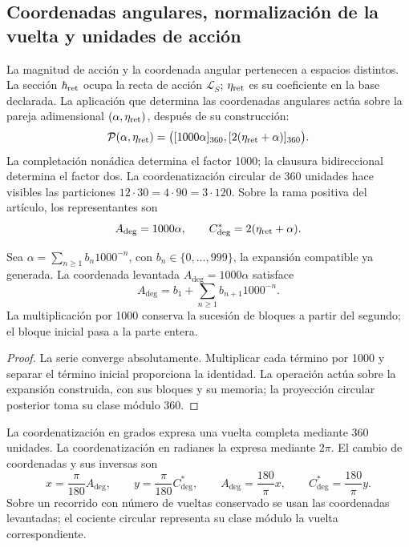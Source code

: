 \subsection{Coordenadas angulares, normalización de la vuelta y unidades de acción}
\label{sec:ii-angulos}

La magnitud de acción y la coordenada angular pertenecen a espacios
distintos. La sección \(\hbar_{\rm ret}\) ocupa la recta de acción
\(\mathcal L_S\); \(\eta_{\rm ret}\) es su coeficiente en la base
declarada. La aplicación que determina las coordenadas angulares actúa sobre la pareja adimensional
\((\alpha,\eta_{\rm ret})\), después de su construcción:
\begin{equation}
 \mathcal P(\alpha,\eta_{\rm ret})
 =\bigl([1000\alpha]_{360},[2(\eta_{\rm ret}+\alpha)]_{360}\bigr).
 \label{eq:ii-par-angular}
\end{equation}
La completación nonádica determina el factor 1000; la clausura
bidireccional determina el factor dos. La coordenatización circular de 360
unidades hace visibles las particiones
\(12\cdot30=4\cdot90=3\cdot120\). Sobre la rama positiva del
artículo, los representantes son
\[
 A_{\deg}=1000\alpha,\qquad
 C^*_{\deg}=2(\eta_{\rm ret}+\alpha).
\]

\begin{proposition}
\label{prop:ii-desplazamiento-angular}
Sea \(\alpha=\sum_{n\geq1}b_n1000^{-n}\), con
\(b_n\in\{0,\ldots,999\}\), la expansión compatible ya generada.
La coordenada levantada \(A_{\deg}=1000\alpha\) satisface
\[
 A_{\deg}=b_1+\sum_{n\geq1}b_{n+1}1000^{-n}.
\]
La multiplicación por 1000 conserva la sucesión de bloques a partir del segundo;
el bloque inicial pasa a la parte entera.
\end{proposition}
\begin{proof}
La serie converge absolutamente. Multiplicar cada término por 1000
y separar el término inicial proporciona la identidad. La operación
actúa sobre la expansión construida, con sus bloques y su memoria;
la proyección circular posterior toma su clase módulo 360.
\end{proof}

\begin{definition}
La coordenatización en grados expresa una vuelta completa mediante 360 unidades.
La coordenatización en radianes la expresa mediante \(2\pi\). El cambio de
coordenadas y sus inversas son
\[
 x=\frac{\pi}{180}A_{\deg},\qquad
 y=\frac{\pi}{180}C^*_{\deg},\qquad
 A_{\deg}=\frac{180}{\pi}x,\qquad
 C^*_{\deg}=\frac{180}{\pi}y.
\]
Sobre un recorrido con número de vueltas conservado se usan las
coordenadas levantadas; el cociente circular representa su clase módulo
la vuelta correspondiente.
\end{definition}


